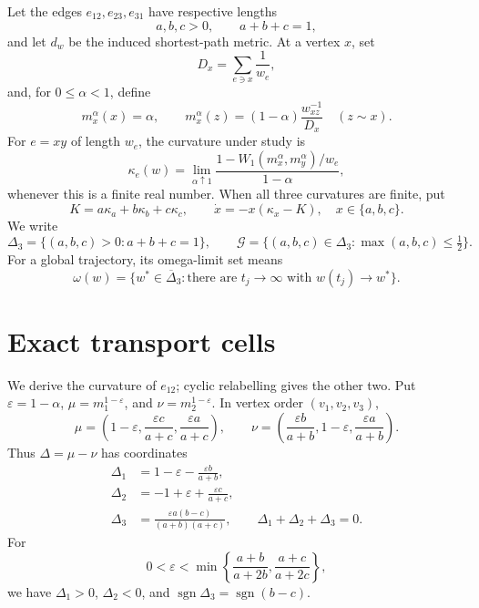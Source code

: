 \documentclass[11pt]{article}
\theoremstyle{remark}
\newcommand{\G}{\mathcal G}
\newcommand{\D}{\Delta_3}
\begin{document}
Let the edges $e_{12},e_{23},e_{31}$ have respective lengths
\[
 a,b,c>0,\qquad a+b+c=1,
\]
and let $d_w$ be the induced shortest-path metric.  At a vertex $x$, set
\[
 D_x=\sum_{e\ni x}\frac1{w_e},
\]
and, for $0\leq\alpha<1$, define
\[
 m_x^\alpha(x)=\alpha,\qquad
 m_x^\alpha(z)=(1-\alpha)\frac{w_{xz}^{-1}}{D_x}\quad(z\sim x).
\]
For $e=xy$ of length $w_e$, the curvature under study is
\begin{equation}\label{eq:literal-curvature}
 \kappa_e(w)=\lim_{\alpha\uparrow1}
 \frac{1-W_1(m_x^\alpha,m_y^\alpha)/w_e}{1-\alpha},
\end{equation}
whenever this is a finite real number.  When all three curvatures are finite,
put
\begin{equation}\label{eq:flow}
 K=a\kappa_a+b\kappa_b+c\kappa_c,
 \qquad \dot x=-x(\kappa_x-K),\quad x\in\{a,b,c\}.
\end{equation}
We write
\[
 \D=\{(a,b,c)>0:a+b+c=1\},\qquad
 \G=\{(a,b,c)\in\D:\max(a,b,c)\leq\tfrac12\}.
\]
For a global trajectory, its omega-limit set means
\[
 \omega(w)=\{w^*\in\overline\D:\text{there are }t_j\to\infty
 \text{ with }w(t_j)\to w^*\}.
\]

\section{Exact transport cells}

We derive the curvature of $e_{12}$; cyclic relabelling gives the other two.
Put $\varepsilon=1-\alpha$, $\mu=m_1^{1-\varepsilon}$, and
$\nu=m_2^{1-\varepsilon}$.  In vertex order $(v_1,v_2,v_3)$,
\[
 \mu=\left(1-\varepsilon,\frac{\varepsilon c}{a+c},
                    \frac{\varepsilon a}{a+c}\right),\qquad
 \nu=\left(\frac{\varepsilon b}{a+b},1-\varepsilon,
                    \frac{\varepsilon a}{a+b}\right).
\]
Thus $\Delta=\mu-\nu$ has coordinates
\begin{align}
 \Delta_1&=1-\varepsilon-\frac{\varepsilon b}{a+b},\nonumber\\
 \Delta_2&=-1+\varepsilon+\frac{\varepsilon c}{a+c},\label{eq:imbalance}\\
 \Delta_3&=\frac{\varepsilon a(b-c)}{(a+b)(a+c)},
 \qquad \Delta_1+\Delta_2+\Delta_3=0.\nonumber
\end{align}
For
\[
0<\varepsilon<\min\left\{\frac{a+b}{a+2b},
                           \frac{a+c}{a+2c}\right\},
\]
we have $\Delta_1>0$, $\Delta_2<0$, and
$\operatorname{sgn}\Delta_3=\operatorname{sgn}(b-c)$.
\end{document}
